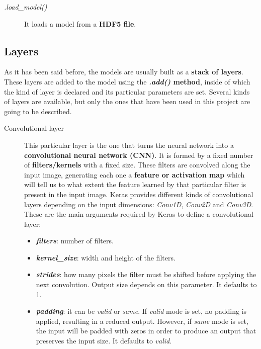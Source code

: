 \begin{description}
	\item[\textit{.load\_model()}] It loads a model from a \textbf{HDF5 file}.
\end{description}

\subsection{Layers}\label{subsec:layers}
As it has been said before, the models are usually built as a \textbf{stack of layers}. These layers are added to the model using the \textbf{\textit{.add()} method}, inside of which the kind of layer is declared and its particular parameters are set. Several kinds of layers are available, but only the ones that have been used in this project are going to be described.
\begin{description}
	\item[Convolutional layer] This particular layer is the one that turns the neural network into a \textbf{convolutional neural network (CNN)}. It is formed by a fixed number of \textbf{filters/kernels} with a fixed size. These filters are convolved along the input image, generating each one a \textbf{feature or activation map} which will tell us to what extent the feature learned by that particular filter is present in the input image. Keras provides different kinds of convolutional layers depending on the input dimensions: \textit{Conv1D}, \textit{Conv2D} and \textit{Conv3D}. These are the main arguments required by Keras to define a convolutional layer:
	\begin{itemize}
		\item \textbf{\textit{filters}}: number of filters.
		
		\item \textbf{\textit{kernel\_size}}: width and height of the filters.
		
		\item \textbf{\textit{strides}}: how many pixels the filter must be shifted before applying the next convolution. Output size depends on this parameter. It defaults to 1.
		
		\item \textbf{\textit{padding}}: it can be \textit{valid} or \textit{same}. If \textit{valid} mode is set, no padding is applied, resulting in a reduced output. However, if \textit{same} mode is set, the input will be padded with zeros in order to produce an output that preserves the input size. It defaults to \textit{valid}.
	\end{itemize}
\end{description}

